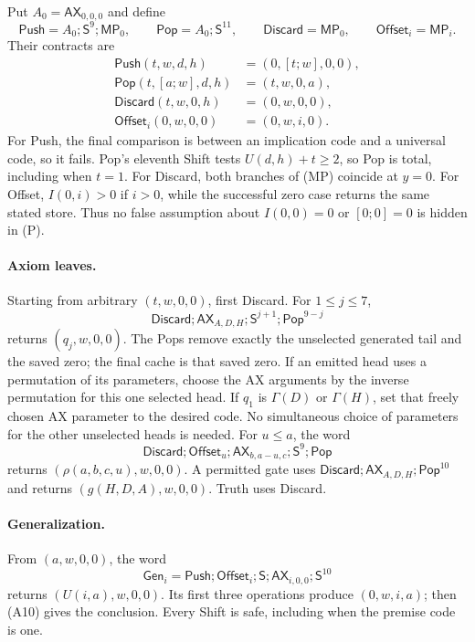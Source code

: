 Put $A_0=\mathsf{AX}_{0,0,0}$ and define
\[
 \mathsf{Push}=A_0;\mathsf S^9;\mathsf{MP}_0,\qquad
 \mathsf{Pop}=A_0;\mathsf S^{11},\qquad
 \mathsf{Discard}=\mathsf{MP}_0,\qquad
 \mathsf{Offset}_i=\mathsf{MP}_i.
\]
Their contracts are
\begin{align*}
 \mathsf{Push}(t,w,d,h)&=(0,[t;w],0,0),\\
 \mathsf{Pop}(t,[a;w],d,h)&=(t,w,0,a),\\
 \mathsf{Discard}(t,w,0,h)&=(0,w,0,0),\\
 \mathsf{Offset}_i(0,w,0,0)&=(0,w,i,0).                    \tag{P}
\end{align*}
For Push, the final comparison is between an implication code and a
universal code, so it fails.  Pop's eleventh Shift tests $U(d,h)+t\ge2$,
so Pop is total, including when $t=1$.  For Discard, both branches of
(MP) coincide at $y=0$.  For Offset, $I(0,i)>0$ if $i>0$, while the
successful zero case returns the same stated store.  Thus no false
assumption about $I(0,0)=0$ or $[0;0]=0$ is hidden in (P).

\paragraph{Axiom leaves.}
Starting from arbitrary $(t,w,0,0)$, first Discard.  For $1\le j\le7$,
\[
 \mathsf{Discard};\mathsf{AX}_{A,D,H};\mathsf S^{j+1};
                 \mathsf{Pop}^{9-j}
\]
returns $(q_j,w,0,0)$.  The Pops remove exactly the unselected generated
tail and the saved zero; the final cache is that saved zero.  If an emitted
head uses a permutation of its parameters, choose the AX arguments by the
inverse permutation for this one selected head. If $q_1$ is $\Gamma(D)$
or $\Gamma(H)$, set that freely chosen AX parameter to the desired code.
No simultaneous choice of parameters for the other unselected heads is
needed.  For $u\le a$, the word
\[
 \mathsf{Discard};\mathsf{Offset}_u;\mathsf{AX}_{b,a-u,c};
                    \mathsf S^9;\mathsf{Pop}
\]
returns $(\rho(a,b,c,u),w,0,0)$.  A permitted gate uses
$\mathsf{Discard};\mathsf{AX}_{A,D,H};\mathsf{Pop}^{10}$ and returns
$(g(H,D,A),w,0,0)$.  Truth uses Discard.

\paragraph{Generalization.}
From $(a,w,0,0)$, the word
\[
 \mathsf{Gen}_i=\mathsf{Push};\mathsf{Offset}_i;\mathsf S;
                         \mathsf{AX}_{i,0,0};\mathsf S^{10}
\]
returns $(U(i,a),w,0,0)$.  Its first three operations produce
$(0,w,i,a)$; then (A10) gives the conclusion.  Every Shift is safe,
including when the premise code is one.


